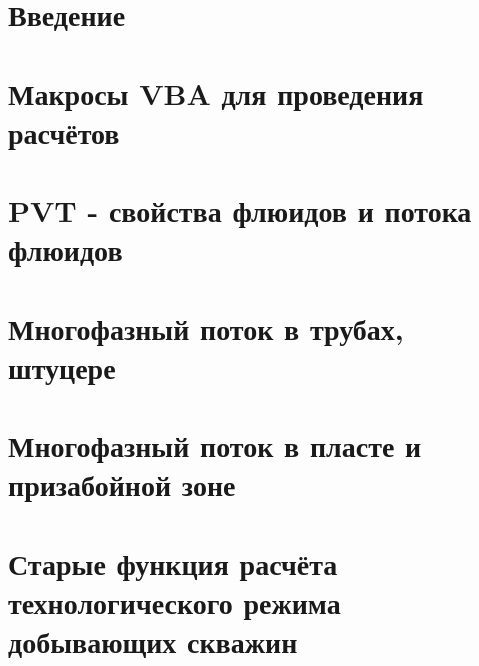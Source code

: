 \documentclass[a4paper,14pt,oneside,openany]{memoir}
\begin{document}
	
	
	\chapter*{Введение}                         %
	\chapter{Макросы VBA для проведения расчётов}
	\chapter{PVT - свойства флюидов и потока флюидов}
	\chapter{Многофазный поток в трубах, штуцере }
	\chapter{Многофазный поток в пласте и призабойной зоне}
    \chapter{Старые функция расчёта технологического режима добывающих скважин}
	
\end{document}
